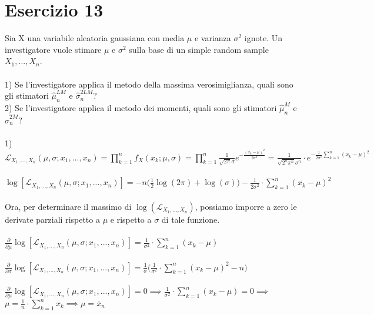 \documentclass{article}
\begin{document}
\section*{Esercizio 13}
Sia X una variabile aleatoria gaussiana con media $\mu$ e varianza $\sigma^{2}$ ignote. Un investigatore vuole stimare $\mu$ e $\sigma^{2}$ sulla base di un simple random sample $X_{1},...,X_{n}$. \\ \\
1) Se l'investigatore applica il metodo della massima verosimiglianza, quali sono gli stimatori $\hat{\mu}_{n}^{LM}$ e $\hat{\sigma}_{n}^{2LM}$?\\
2) Se l'investigatore applica il metodo dei momenti, quali sono gli stimatori $\hat{\mu}_{n}^{M}$ e $\hat{\sigma}_{n}^{2M}$?\\
\\
1) $\mathcal{L}_{X_{1},...,X_{n}}(\mu, \sigma; x_{1},...,x_{n}) = \prod_{k=1}^{n}f_{X}(x_{k}; \mu, \sigma) = \prod_{k=1}^{n}\frac{1}{\sqrt{2\pi}\sigma}e^{-\frac{(x_{k}-\mu)^{2}}{2\sigma^{2}}} = \frac{1}{\sqrt{2^{n}\pi^{n}}\sigma^{n}}\cdot e^{-\frac{1}{2\sigma^{2}}\sum_{k=1}^{n}(x_{k}-\mu)^{2}}$\\ \\
$\log[\mathcal{L}_{X_{1},...,X_{n}}(\mu, \sigma; x_{1},...,x_{n})] = -n\Big(\frac{1}{2}\log(2\pi)+\log(\sigma)\Big) - \frac{1}{2\sigma^{2}}\cdot \sum_{k=1}^{n}(x_{k}-\mu)^{2}$\\ \\
Ora, per determinare il massimo di $\log(\mathcal{L}_{X_{1},...,X_{n}})$, possiamo imporre a zero le derivate parziali rispetto a $\mu$ e rispetto a $\sigma$ di tale funzione. \\ \\
$\frac{\partial}{\partial \mu}\log[\mathcal{L}_{X_{1},...,X_{n}}(\mu, \sigma; x_{1},...,x_{n})] = \frac{1}{\sigma^{2}}\cdot \sum_{k=1}^{n}(x_{k}-\mu)$\\ \\
$\frac{\partial}{\partial \sigma}\log[\mathcal{L}_{X_{1},...,X_{n}}(\mu, \sigma; x_{1},...,x_{n})] = \frac{1}{\sigma} \Big(\frac{1}{\sigma^{2}}\cdot \sum_{k=1}^{n}(x_{k}-\mu)^{2} - n \Big)$\\ \\
$\frac{\partial}{\partial \mu}\log[\mathcal{L}_{X_{1},...,X_{n}}(\mu, \sigma; x_{1},...,x_{n})] = 0 \implies \frac{1}{\sigma^{2}}\cdot \sum_{k=1}^{n}(x_{k}-\mu) = 0 \implies$\\ $\mu = \frac{1}{n}\cdot \sum_{k=1}^{n}x_{k} \implies \mu = \overline{x}_{n}$\\ \\
\end{document}
